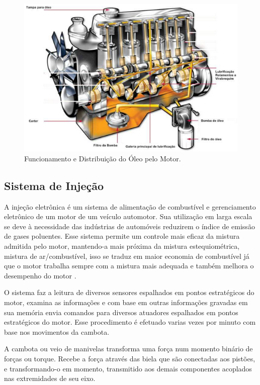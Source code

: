 \begin{figure}[h!]
	\centering
	\includegraphics[keepaspectratio=true,scale= 0.7]{figuras/oleomotor.png}
	\caption{Funcionamento e Distribuição do Óleo pelo Motor.}
	\label{fig:oleomotor}
\end{figure}

\subsection{Sistema de Injeção}

	A injeção eletrônica é um sistema de alimentação de combustível e gerenciamento eletrônico de um motor de um veículo automotor. Sua utilização em larga escala se deve à necessidade das indústrias de automóveis reduzirem o índice de emissão de gases poluentes. Esse sistema permite um controle mais eficaz da mistura admitida pelo motor, mantendo-a mais próxima da mistura estequiométrica, mistura de ar/combustível, isso se traduz em maior economia de combustível já que o motor trabalha sempre com a mistura mais adequada e também melhora o desempenho do motor \cite{bosch2004}.
	
	O sistema faz a leitura de diversos sensores espalhados em pontos estratégicos do motor, examina as informações e com base em outras informações gravadas em sua memória envia comandos para diversos atuadores espalhados em pontos estratégicos do motor. Esse procedimento é efetuado varias vezes por minuto com base nos movimentos da cambota.
	
	A cambota ou veio de manivelas transforma uma força num momento binário de forças ou torque. Recebe a força através das biela que são conectadas aos pistões, e transformando-o em momento, transmitido aos demais componentes acoplados nas extremidades de seu eixo.
	
